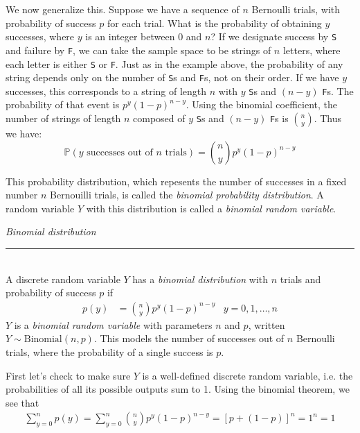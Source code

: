 \documentclass[12pt]{article}
\theoremstyle{definition}
\theoremstyle{remark}
\def\P{{\mathbb P}}
\begin{document}
We now generalize this. Suppose we have a sequence of $n$ Bernoulli trials, with probability of success $p$ for each trial. What is the probability of obtaining $y$ successes, where $y$ is an integer between 0 and $n$? If we designate success by \texttt{S} and failure by \texttt{F}, we can take the sample space to be strings of $n$ letters, where each letter is either \texttt{S} or \texttt{F}. Just as in the example above, the probability of any string depends only on the number of \texttt{S}s and \texttt{F}s, not on their order. If we have $y$ successes, this corresponds to a string of length $n$ with $y$ \texttt{S}s and $(n-y)$ \texttt{F}s. The probability of that event is $p^y(1-p)^{n-y}$. Using the binomial coefficient, the number of strings of length $n$ composed of $y$ \texttt{S}s and $(n-y)$ \texttt{F}s is $\binom{n}{y}$. Thus we have:
\[
\P(\text{$y$ successes out of $n$ trials})= \binom{n}{y} p^y (1-p)^{n-y}
\]

This probability distribution, which repesents the number of successes in a fixed number $n$ Bernouilli trials, is called the \emph{binomial probability distribution}. A random variable $Y$ with this distribution is called a \emph{binomial random variable}.

\begin{framed}
  \emph{Binomial distribution}\\
  \rule{\dimexpr{}\fboxrule}{.1pt} \\
A discrete random variable $Y$ has a \emph{binomial distribution} with $n$ trials and probability of success $p$ if
\begin{align*}
p(y) &= \binom{n}{y} p^y (1-p)^{n-y} & y = 0, 1, \dots, n
\end{align*}
$Y$ is a \emph{binomial random variable} with parameters $n$ and $p$, written $Y \sim \text{Binomial}(n, p)$. This models the number of successes out of $n$ Bernoulli trials, where the probability of a single success is $p$.
\end{framed}

First let's check to make sure $Y$ is a well-defined discrete random variable, i.e. the probabilities of all its possible outputs sum to 1. Using the binomial theorem, we see that
\begin{align*}
\sum_{y=0}^n p(y) = \sum_{y=0}^n \binom{n}{y} p^y (1-p)^{n-y} = \left[p + (1 - p)\right]^n = 1^n = 1
\end{align*}
\end{document}
